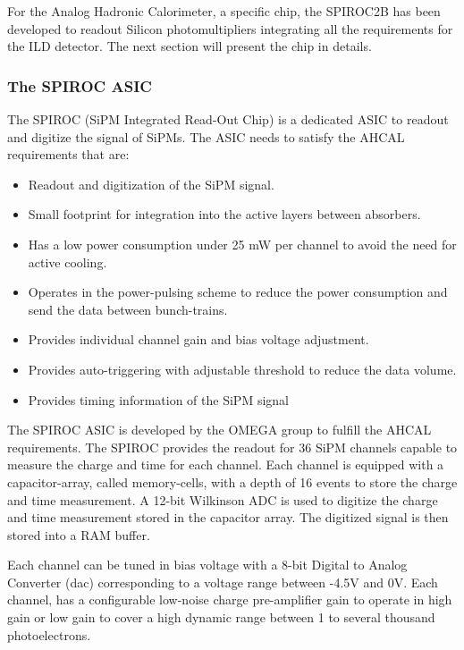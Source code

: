 For the Analog Hadronic Calorimeter, a specific chip, the SPIROC2B has been developed to readout Silicon photomultipliers integrating all the requirements for the ILD detector. The next section will present the chip in details.

\subsubsection{The SPIROC ASIC}
\label{sec:SPIROC2B}

The SPIROC (SiPM Integrated Read-Out Chip) \cite{5401891} is a dedicated ASIC to readout and digitize the signal of SiPMs. The ASIC needs to satisfy the AHCAL requirements that are:

\begin{itemize}
  \item Readout and digitization of the SiPM signal.
  \item Small footprint for integration into the active layers between absorbers.
  \item Has a low power consumption under 25 mW per channel to avoid the need for active cooling.
  \item Operates in the power-pulsing scheme to reduce the power consumption and send the data between bunch-trains.
  \item Provides individual channel gain and bias voltage adjustment.
  \item Provides auto-triggering with adjustable threshold to reduce the data volume.
  \item Provides timing information of the SiPM signal
\end{itemize}

The SPIROC ASIC is developed by the OMEGA group \cite{OmegaWeb} to fulfill the AHCAL requirements. The SPIROC provides the readout for 36 SiPM channels capable to measure the charge and time for each channel. Each channel is equipped with a capacitor-array, called memory-cells, with a depth of 16 events to store the charge and time measurement. A 12-bit Wilkinson ADC is used to digitize the charge and time measurement stored in the capacitor array. The digitized signal is then stored into a RAM buffer.

Each channel can be tuned in bias voltage with a 8-bit Digital to Analog Converter (\acrshort{dac}) corresponding to a voltage range between -4.5V and 0V. Each channel, has a configurable low-noise charge pre-amplifier gain to operate in high gain or low gain to cover a high dynamic range between 1 to several thousand photoelectrons.

